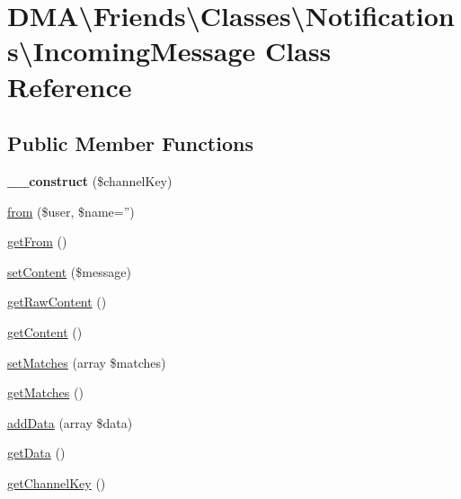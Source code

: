 \hypertarget{classDMA_1_1Friends_1_1Classes_1_1Notifications_1_1IncomingMessage}{\section{D\+M\+A\textbackslash{}Friends\textbackslash{}Classes\textbackslash{}Notifications\textbackslash{}Incoming\+Message Class Reference}
\label{classDMA_1_1Friends_1_1Classes_1_1Notifications_1_1IncomingMessage}
}
\subsection*{Public Member Functions}
\begin{DoxyCompactItemize}
\item 
\hypertarget{classDMA_1_1Friends_1_1Classes_1_1Notifications_1_1IncomingMessage_a859682e7cd422373fd51aeb05e4a8ecd}{{\bfseries \+\_\+\+\_\+construct} (\$channel\+Key)}\label{classDMA_1_1Friends_1_1Classes_1_1Notifications_1_1IncomingMessage_a859682e7cd422373fd51aeb05e4a8ecd}

\item 
\hyperlink{classDMA_1_1Friends_1_1Classes_1_1Notifications_1_1IncomingMessage_a2a37952bdb070d65012f6895d0abd542}{from} (\$user, \$name='')
\item 
\hyperlink{classDMA_1_1Friends_1_1Classes_1_1Notifications_1_1IncomingMessage_a5d7b4a3a75d403ba5e3f250dbe6bb1fc}{get\+From} ()
\item 
\hyperlink{classDMA_1_1Friends_1_1Classes_1_1Notifications_1_1IncomingMessage_a120b5ebba73260b40a0b6a820e26862d}{set\+Content} (\$message)
\item 
\hyperlink{classDMA_1_1Friends_1_1Classes_1_1Notifications_1_1IncomingMessage_aadc7710a506f38776f93ef4beb64e01b}{get\+Raw\+Content} ()
\item 
\hyperlink{classDMA_1_1Friends_1_1Classes_1_1Notifications_1_1IncomingMessage_a6c870deb4ee36765884d7c7e70d79203}{get\+Content} ()
\item 
\hyperlink{classDMA_1_1Friends_1_1Classes_1_1Notifications_1_1IncomingMessage_a1a9c1b9b62e4601d0f31ee1c2e4c9272}{set\+Matches} (array \$matches)
\item 
\hyperlink{classDMA_1_1Friends_1_1Classes_1_1Notifications_1_1IncomingMessage_a55e79b4061799e19ce96a13b5b59f4a6}{get\+Matches} ()
\item 
\hyperlink{classDMA_1_1Friends_1_1Classes_1_1Notifications_1_1IncomingMessage_a9fd9a20192b9afc5000660391ebf3a01}{add\+Data} (array \$data)
\item 
\hyperlink{classDMA_1_1Friends_1_1Classes_1_1Notifications_1_1IncomingMessage_a13920ffca0f167439137e3766187dc3e}{get\+Data} ()
\item 
\hyperlink{classDMA_1_1Friends_1_1Classes_1_1Notifications_1_1IncomingMessage_a9a6d0d32bb31053a0880db8886001c41}{get\+Channel\+Key} ()
\end{DoxyCompactItemize}
